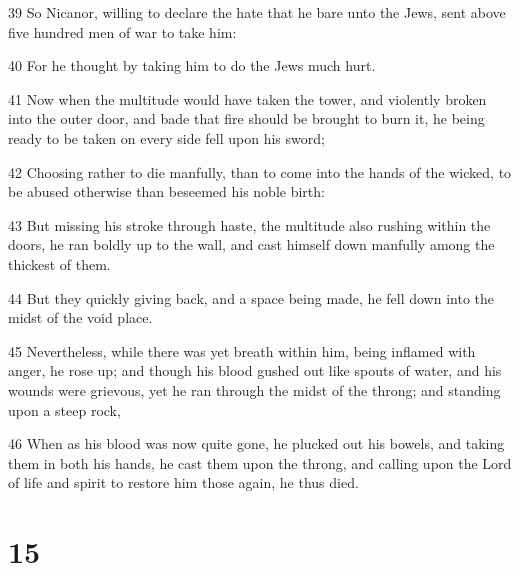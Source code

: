 \par 39 So Nicanor, willing to declare the hate that he bare unto the Jews, sent above five hundred men of war to take him:
\par 40 For he thought by taking him to do the Jews much hurt.
\par 41 Now when the multitude would have taken the tower, and violently broken into the outer door, and bade that fire should be brought to burn it, he being ready to be taken on every side fell upon his sword;
\par 42 Choosing rather to die manfully, than to come into the hands of the wicked, to be abused otherwise than beseemed his noble birth:
\par 43 But missing his stroke through haste, the multitude also rushing within the doors, he ran boldly up to the wall, and cast himself down manfully among the thickest of them.
\par 44 But they quickly giving back, and a space being made, he fell down into the midst of the void place.
\par 45 Nevertheless, while there was yet breath within him, being inflamed with anger, he rose up; and though his blood gushed out like spouts of water, and his wounds were grievous, yet he ran through the midst of the throng; and standing upon a steep rock,
\par 46 When as his blood was now quite gone, he plucked out his bowels, and taking them in both his hands, he cast them upon the throng, and calling upon the Lord of life and spirit to restore him those again, he thus died.

\chapter{15}

